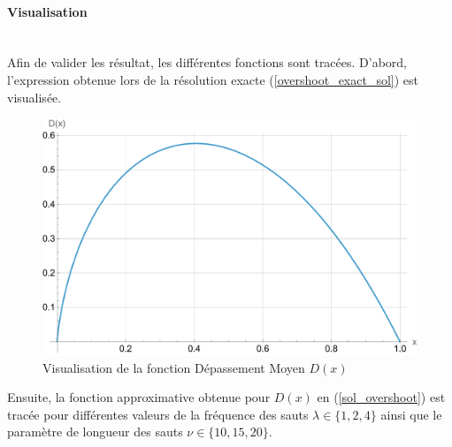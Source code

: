 \paragraph{Visualisation}\phantom{}\\
Afin de valider les résultat, les différentes fonctions sont tracées. D'abord, l'expression obtenue lors de la résolution exacte (\ref{overshoot_exact_sol}) est visualisée.
\begin{figure}[htb]
    \centering
    \includegraphics[width=0.5\linewidth]{img/validation/Ovs/exact.pdf}
    \caption{Visualisation de la fonction Dépassement Moyen $D(x)$}\label{fig:OvershootExactSol}
\end{figure}
\FloatBarrier Ensuite, la fonction approximative obtenue pour $D(x)$ en (\ref{sol_overshoot}) est tracée pour différentes valeurs de la fréquence des sauts $\lambda\in\{1,2,4\}$ ainsi que le paramètre de longueur des sauts $\nu\in\{10,15,20\}$.
